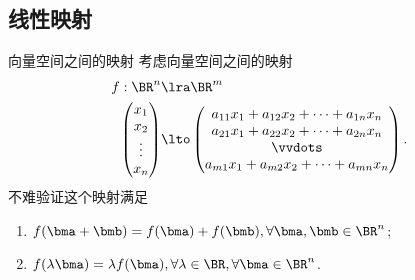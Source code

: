 \subsection{线性映射}
\begin{frame}{向量空间之间的映射\noexer}
	\onslide<+->
	考虑向量空间之间的映射
	\begin{align*}
		f:\BR^n&\lra\BR^m\\
		\begin{pmatrix}
			x_1\\
			x_2\\
			\vdots\\
			x_n
		\end{pmatrix}&\lto
		\begin{pmatrix}
			a_{11}x_1+a_{12}x_2+\cdots+a_{1n}x_n\\
			a_{21}x_1+a_{22}x_2+\cdots+a_{2n}x_n\\
			\vvdots\\
			a_{m1}x_1+a_{m2}x_2+\cdots+a_{mn}x_n
		\end{pmatrix}.
	\end{align*}
	\onslide<+->
	不难验证这个映射满足
	\begin{enumerate}
		\item $f(\bma+\bmb)=f(\bma)+f(\bmb),\forall \bma,\bmb\in \BR^n$;
		\item $f(\lambda \bma)=\lambda f(\bma),\forall \lambda\in\BR,\forall\bma\in \BR^n$.
	\end{enumerate}
\end{frame}


